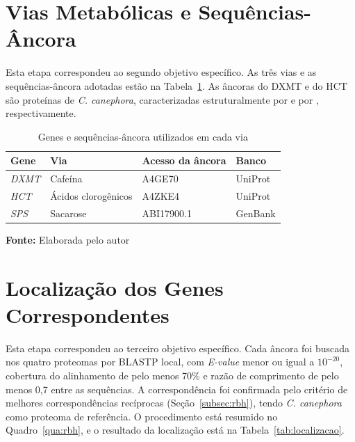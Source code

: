 \section{Vias Metabólicas e Sequências-Âncora}

Esta etapa correspondeu ao segundo objetivo específico. As três vias e as sequências-âncora adotadas estão na Tabela~\ref{tab:ancoras}. As âncoras do DXMT e do HCT são proteínas de \textit{C. canephora}, caracterizadas estruturalmente por  e por , respectivamente.

\FloatBarrier
\begin{table}[!htbp]
	\centering
	\SingleSpacing\small
	\caption{Genes e sequências-âncora utilizados em cada via}
	\begin{tabularx}{\textwidth}{@{}llll@{}}
		\toprule
		\textbf{Gene} & \textbf{Via} & \textbf{Acesso da âncora} & \textbf{Banco} \\
		\midrule
		\textit{DXMT} & Cafeína             & A4GE70     & UniProt \\
		\textit{HCT}  & Ácidos clorogênicos & A4ZKE4     & UniProt \\
		\textit{SPS}  & Sacarose            & ABI17900.1 & GenBank \\
		\bottomrule
	\end{tabularx}
	\par\vspace{0.2cm}
	\textbf{Fonte:} Elaborada pelo autor
	\label{tab:ancoras}
\end{table}
\FloatBarrier

\section{Localização dos Genes Correspondentes}

Esta etapa correspondeu ao terceiro objetivo específico. Cada âncora foi buscada nos quatro proteomas por BLASTP local, com \textit{E-value} menor ou igual a $10^{-20}$, cobertura do alinhamento de pelo menos 70\% e razão de comprimento de pelo menos 0,7 entre as sequências. A correspondência foi confirmada pelo critério de melhores correspondências recíprocas (Seção~\ref{subsec:rbh}), tendo \textit{C. canephora} como proteoma de referência. O procedimento está resumido no Quadro~\ref{qua:rbh}, e o resultado da localização está na Tabela~\ref{tab:localizacao}.

